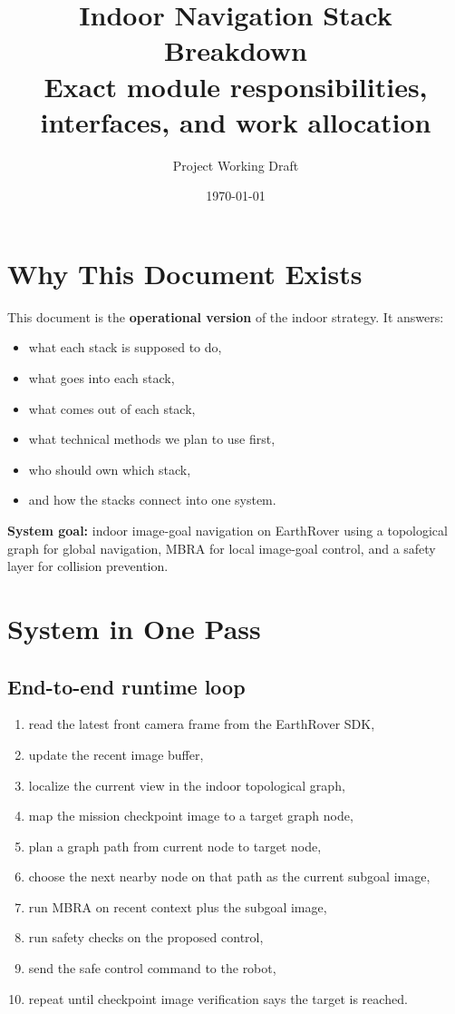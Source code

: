 \documentclass[11pt,a4paper]{article}
\title{Indoor Navigation Stack Breakdown\\[0.3em]
\large Exact module responsibilities, interfaces, and work allocation}
\author{Project Working Draft}
\date{\today}
\begin{document}
\maketitle
\tableofcontents
\newpage

\section{Why This Document Exists}

This document is the \textbf{operational version} of the indoor strategy.
It answers:
\begin{itemize}[nosep]
  \item what each stack is supposed to do,
  \item what goes into each stack,
  \item what comes out of each stack,
  \item what technical methods we plan to use first,
  \item who should own which stack,
  \item and how the stacks connect into one system.
\end{itemize}

\begin{mdframed}
\textbf{System goal:} indoor image-goal navigation on EarthRover using a
topological graph for global navigation, MBRA for local image-goal control, and
a safety layer for collision prevention.
\end{mdframed}


\section{System in One Pass}

\subsection*{End-to-end runtime loop}

\begin{enumerate}[nosep]
  \item read the latest front camera frame from the EarthRover SDK,
  \item update the recent image buffer,
  \item localize the current view in the indoor topological graph,
  \item map the mission checkpoint image to a target graph node,
  \item plan a graph path from current node to target node,
  \item choose the next nearby node on that path as the current subgoal image,
  \item run MBRA on recent context plus the subgoal image,
  \item run safety checks on the proposed control,
  \item send the safe control command to the robot,
  \item repeat until checkpoint image verification says the target is reached.
\end{enumerate}
\end{document}
